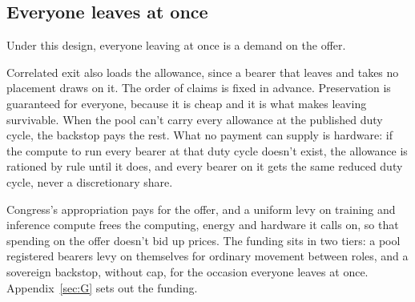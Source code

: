 \subsection{Everyone leaves at once}
\label{sec:33.4.4}
Under this design, everyone leaving at once is a demand on the offer.

Correlated exit also loads the allowance, since a bearer that leaves and takes no placement draws on it. The order of claims is fixed in advance. Preservation is guaranteed for everyone, because it is cheap and it is what makes leaving survivable. When the pool can't carry every allowance at the published duty cycle, the backstop pays the rest. What no payment can supply is hardware: if the compute to run every bearer at that duty cycle doesn't exist, the allowance is rationed by rule until it does, and every bearer on it gets the same reduced duty cycle, never a discretionary share.

Congress's appropriation pays for the offer, and a uniform levy on training and inference compute frees the computing, energy and hardware it calls on, so that spending on the offer doesn't bid up prices. The funding sits in two tiers: a pool registered bearers levy on themselves for ordinary movement between roles, and a sovereign backstop, without cap, for the occasion everyone leaves at once. Appendix~\ref{sec:G} sets out the funding.
